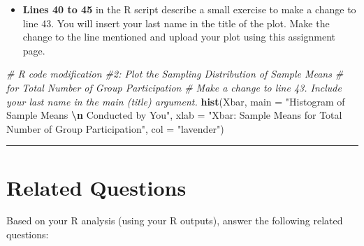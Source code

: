 \documentclass[oneside,openany]{book}
\newenvironment{Shaded}{\begin{snugshade}}{\end{snugshade}}
\newcommand{\AttributeTok}[1]{\textcolor[rgb]{0.13,0.29,0.53}{#1}}
\newcommand{\CommentTok}[1]{\textcolor[rgb]{0.56,0.35,0.01}{\textit{#1}}}
\newcommand{\FunctionTok}[1]{\textcolor[rgb]{0.13,0.29,0.53}{\textbf{#1}}}
\newcommand{\NormalTok}[1]{#1}
\newcommand{\SpecialCharTok}[1]{\textcolor[rgb]{0.81,0.36,0.00}{\textbf{#1}}}
\newcommand{\StringTok}[1]{\textcolor[rgb]{0.31,0.60,0.02}{#1}}
\providecommand{\tightlist}{%
  \setlength{\itemsep}{0pt}\setlength{\parskip}{0pt}}
\begin{document}
\begin{enumerate}
  \begin{itemize}
  \tightlist
  \item
    \textbf{Lines 40 to 45} in the R script describe a small exercise to make a change to line 43. You will insert your last name in the title of the plot. Make the change to the line mentioned and upload your plot using this assignment page.
  \end{itemize}

\begin{Shaded}
\begin{Highlighting}[]
 \CommentTok{\# R code modification \#2: Plot the Sampling Distribution of Sample Means}
 \CommentTok{\# for Total Number of Group Participation}
 \CommentTok{\# Make a change to line 43. Include your last name in the main (title) argument.}
   \FunctionTok{hist}\NormalTok{(Xbar, }
      \AttributeTok{main =} \StringTok{"Histogram of Sample Means }\SpecialCharTok{\textbackslash{}n}\StringTok{ Conducted by You"}\NormalTok{, }
      \AttributeTok{xlab =} \StringTok{"Xbar: Sample Means for Total Number of Group Participation"}\NormalTok{, }
      \AttributeTok{col =} \StringTok{"lavender"}\NormalTok{)}
\end{Highlighting}
\end{Shaded}
\end{enumerate}

\begin{center}\rule{0.5\linewidth}{0.5pt}\end{center}

\section{Related Questions}\label{related-questions-3}

Based on your R analysis (using your R outputs), answer the following related questions:
\end{document}
